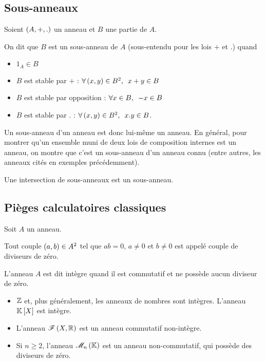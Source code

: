 \subsection{Sous-anneaux}

\begin{defi}
Soient \(\anneau{A}[+][.]\) un anneau et \(B\) une partie de \(A\).

On dit que \(B\) est un sous-anneau de \(A\) (sous-entendu pour les lois \(+\) et \(.\)) quand

\begin{itemize}
    \item \(1_A\in B\) \\
    \item \(B\) est stable par \(+\) : \(\quantifs{\forall\paren{x,y}\in B^2}x+y\in B\) \\
    \item \(B\) est stable par opposition : \(\quantifs{\forall x\in B}-x\in B\) \\
    \item \(B\) est stable par \(.\) : \(\quantifs{\forall\paren{x,y}\in B^2}x.y\in B\).
\end{itemize}
\end{defi}

Un sous-anneau d'un anneau est donc lui-même un anneau. En général, pour montrer qu'un ensemble muni de deux lois de composition internes est un anneau, on montre que c'est un sous-anneau d'un anneau connu (entre autres, les anneaux cités en exemples précédemment).

\begin{prop}
Une intersection de sous-anneaux est un sous-anneau.
\end{prop}

\subsection{Pièges calculatoires classiques}

\begin{defi}
Soit \(A\) un anneau.

Tout couple \(\left(a,b\right)\in A^2\) tel que \(ab=0\), \(a\not=0\) et \(b\not=0\) est appelé couple de diviseurs de zéro.

L'anneau \(A\) est dit intègre quand il est commutatif et ne possède aucun diviseur de zéro.
\end{defi}

\begin{ex}
\begin{itemize}
    \item \(\mathbb{Z}\) et, plus généralement, les anneaux de nombres sont intègres. L'anneau \(\poly\) est intègre. \\
    \item L'anneau \(\mathscr{F}\left(X,\mathbb{R}\right)\) est un anneau commutatif non-intègre. \\
    \item Si \(n\geq2\), l'anneau \(\M{n}\) est un anneau non-commutatif, qui possède des diviseurs de zéro.
\end{itemize}
\end{ex}

